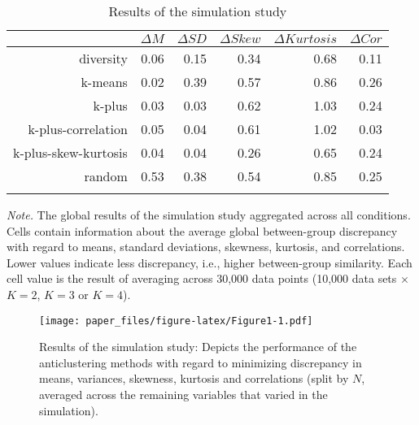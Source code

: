 \documentclass[
  man,floatsintext]{apa7}
\begin{document}
\begin{singlespace}


\begin{table}[tbp]

\begin{center}
\begin{threeparttable}

\caption{\label{tab:Table1}Results of the simulation study}

\begin{tabular}{rrrrrr}
\toprule
 & \multicolumn{1}{c}{$\Delta M$} & \multicolumn{1}{c}{$\Delta \mathit{SD}$} & \multicolumn{1}{c}{$\Delta \mathit{Skew}$} & \multicolumn{1}{c}{$\Delta \mathit{Kurtosis}$} & \multicolumn{1}{c}{$\Delta \mathit{Cor}$}\\
\midrule
diversity & 0.06 & 0.15 & 0.34 & 0.68 & 0.11\\
k-means & 0.02 & 0.39 & 0.57 & 0.86 & 0.26\\
k-plus & 0.03 & 0.03 & 0.62 & 1.03 & 0.24\\
k-plus-correlation & 0.05 & 0.04 & 0.61 & 1.02 & 0.03\\
k-plus-skew-kurtosis & 0.04 & 0.04 & 0.26 & 0.65 & 0.24\\
random & 0.53 & 0.38 & 0.54 & 0.85 & 0.25\\
\bottomrule
\addlinespace
\end{tabular}

\begin{tablenotes}[para]
\normalsize{\textit{Note.} The global results of the simulation study aggregated across all conditions. Cells contain information about the average global between-group discrepancy with regard to means, standard deviations, skewness, kurtosis, and correlations. Lower values indicate less discrepancy, i.e., higher between-group similarity. Each cell value is the result of averaging across 30,000 data points (10,000 data sets $\times$ $K = 2$, $K = 3$ or $K = 4$).}
\end{tablenotes}

\end{threeparttable}
\end{center}

\end{table}

\end{singlespace}

\begin{figure}
\centering
\texttt{[image: paper\_files/figure-latex/Figure1-1.pdf]}
\caption{\label{fig:Figure1}Results of the simulation study: Depicts the performance of the anticlustering methods with regard to minimizing discrepancy in means, variances, skewness, kurtosis and correlations (split by \(N\), averaged across the remaining variables that varied in the simulation).}
\end{figure}
\end{document}

